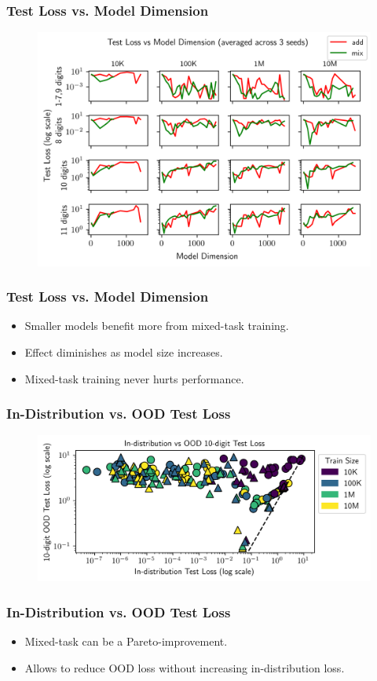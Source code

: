 \documentclass[14pt,aspectratio=169]{beamer}
\theoremstyle{remark}
\begin{document}
\begin{frame}
    \frametitle{Test Loss vs. Model Dimension}
    \begin{figure}
        \centering
        \includegraphics[width=0.6\linewidth]{fig/exp_27_test_loss_vs_n_embd.png}
    \end{figure}
\end{frame}

\begin{frame}
    \frametitle{Test Loss vs. Model Dimension}
    \begin{itemize}
        \item Smaller models benefit more from mixed-task training.
        \item Effect diminishes as model size increases.
        \item Mixed-task training never hurts performance.
    \end{itemize}
\end{frame}

\begin{frame}
    \frametitle{In-Distribution vs. OOD Test Loss}
    \begin{figure}
        \centering
        \includegraphics[width=0.8\linewidth]{fig/subtask_overfitting.png}
    \end{figure}
\end{frame}


\begin{frame}
    \frametitle{In-Distribution vs. OOD Test Loss}
    \begin{itemize}
        \item Mixed-task can be a Pareto-improvement.
        \item Allows to reduce OOD loss without increasing in-distribution loss.
    \end{itemize}
\end{frame}
\end{document}
